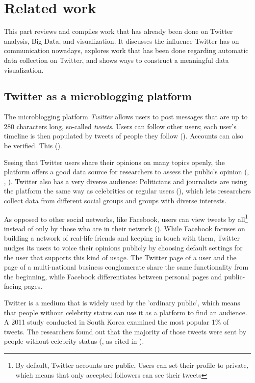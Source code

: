 \section{Related work}
This part reviews and compiles work that has already been done on Twitter analysis, Big Data, and visualization. It discusses the influence Twitter has on communication nowadays, explores work that has been done regarding automatic data collection on Twitter, and shows ways to construct a meaningful data visualization.

\subsection{Twitter as a microblogging platform}
The microblogging platform \emph{Twitter} allows users to post messages that are up to 280 characters long, so-called \emph{tweets}. Users can follow other users; each user's timeline is then populated by tweets of people they follow (\cite{thimmTwitterAlsWahlkampfmedium2012}). Accounts can also be verified. This  (\cite{twitterinc.VerifiedAccounts}).

Seeing that Twitter users share their opinions on many topics openly, the platform offers a good data source for researchers to assess the public's opinion (\cite{pak2010twitter}, \cite{pfaffenberger2016twitter}, \cite{broniatowski2014twitter}). Twitter also has a very diverse audience: Politicians and journalists are using the platform the same way as celebrities or regular users (\cite{pak2010twitter}), which lets researchers collect data from different social groups and groups with diverse interests.

As opposed to other social networks, like Facebook, users can view tweets by all\footnote{By default, Twitter accounts are public. Users can set their profile to private, which means that only accepted followers can see their tweets} instead of only by those who are in their network (\cite{parkDoesTwitterMotivate2013}). While Facebook focuses on building a network of real-life friends and keeping in touch with them, Twitter nudges its users to voice their opinions publicly by choosing default settings for the user that supports this kind of usage. The Twitter page of a user and the page of a multi-national business conglomerate share the same functionality from the beginning, while Facebook differentiates between personal pages and public-facing pages.

Twitter is a medium that is widely used by the 'ordinary public', which means that people without celebrity status can use it as a platform to find an audience. A 2011 study conducted in South Korea examined the most popular 1\% of tweets. The researchers found out that the majority of those tweets were sent by people without celebrity status (\cite{chang2011structure}, as cited in \cite{parkDoesTwitterMotivate2013}).


